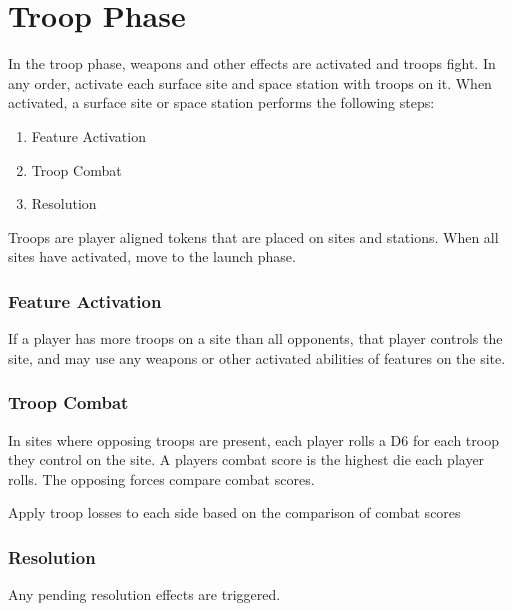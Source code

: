 \chapter{Troop Phase}

In the troop phase, weapons and other effects are activated and troops fight. In any order, activate each surface site and space station with troops on it. When activated, a surface site or space station performs the following steps:

\begin{enumerate}
	\item Feature Activation
	\item Troop Combat
	\item Resolution
\end{enumerate}

Troops are player aligned tokens that are placed on sites and stations. When all sites have activated, move to the launch phase.

\subsection{Feature Activation}
If a player has more troops on a site than all opponents, that player controls the site, and may use any weapons or other activated abilities of features on the site.

\subsection{Troop Combat}
In sites where opposing troops are present, each player rolls a D6 for each troop they control on the site. A players combat score is the highest die each player rolls. The opposing forces compare combat scores.
\begin{center}
\end{center}
 Apply troop losses to each side based on the  comparison of combat scores
 
 \subsection{Resolution}
 Any pending resolution effects are triggered.